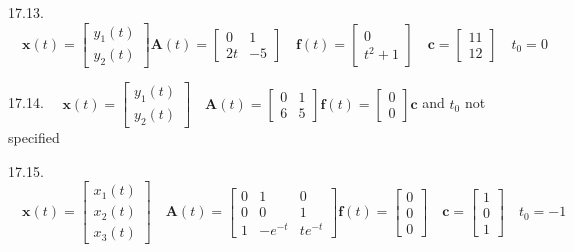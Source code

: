 \documentclass[10pt]{article}
\begin{document}
17.13. $\quad \mathbf{x}(t)=\left[\begin{array}{l}y_{1}(t) \\ y_{2}(t)\end{array}\right] \mathbf{A}(t)=\left[\begin{array}{rr}0 & 1 \\ 2 t & -5\end{array}\right] \quad \mathbf{f}(t)=\left[\begin{array}{c}0 \\ t^{2}+1\end{array}\right] \quad \mathbf{c}=\left[\begin{array}{l}11 \\ 12\end{array}\right] \quad t_{0}=0$

17.14. $\quad \mathbf{x}(t)=\left[\begin{array}{l}y_{1}(t) \\ y_{2}(t)\end{array}\right] \quad \mathbf{A}(t)=\left[\begin{array}{ll}0 & 1 \\ 6 & 5\end{array}\right] \mathbf{f}(t)=\left[\begin{array}{l}0 \\ 0\end{array}\right] \mathbf{c}$ and $t_{0}$ not specified

17.15. $\quad \mathbf{x}(t)=\left[\begin{array}{l}x_{1}(t) \\ x_{2}(t) \\ x_{3}(t)\end{array}\right] \quad \mathbf{A}(t)=\left[\begin{array}{ccc}0 & 1 & 0 \\ 0 & 0 & 1 \\ 1 & -e^{-t} & t e^{-t}\end{array}\right] \mathbf{f}(t)=\left[\begin{array}{l}0 \\ 0 \\ 0\end{array}\right] \quad \mathbf{c}=\left[\begin{array}{l}1 \\ 0 \\ 1\end{array}\right] \quad t_{0}=-1$
\end{document}
